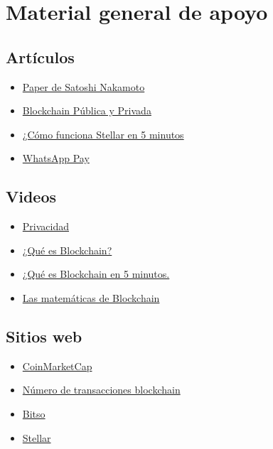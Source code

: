 \documentclass[a4paper,12pt]{/home/armando/Documentos/Cursos/LaTeX/Plantillas/lib/pub}
\begin{document}
\section{Material general de apoyo}
	\subsection{Artículos}
	\begin{itemize}
		\item \href{https://bitcoin.org/files/bitcoin-paper/bitcoin\_es\_latam.pdf}{Paper de Satoshi Nakamoto}
		\item \href{https://medium.com/@marvin.soto/blockchain-público-vs-blockchain-privado-cuál-es-la-diferencia-8115be4a593b}{Blockchain Pública y Privada}
		\item \href{https://medium.com/blockchain-academy-mexico/aprende-c%C3%B3mo-funciona-stellar-en-5-minutos-765d3e0b6027}{¿Cómo funciona Stellar en 5 minutos}
		\item \href{https://www.xataka.com/aplicaciones/whatsapp-pay-sistema-pagos-whatsapp-llegara-a-varios-paises-proximos-seis-meses?fbclid=IwAR03PMR7ZqF2t_TRfVwdp7VAG5fyt9-DbxErcku5fPAIZEmKdCcv7UDLFsQ}{WhatsApp Pay}
		
	\end{itemize}
	\subsection{Videos}
	\begin{itemize}
		\item \href{https://www.youtube.com/watch?v=RSj9QQMPMWg}{Privacidad}
		\item \href{https://www.youtube.com/watch?v=E2QT9RHmNsY}{¿Qué es Blockchain?}	
		\item \href{https://www.youtube.com/watch?v=Yn8WGaO\_\_ak\&list=PLgo3Qtdm2bOMKyzFGy-B3MiDAGPIeqbKP\&index=2}{¿Qué es Blockchain en 5 minutos.}
		\item \href{https://www.youtube.com/watch?v=b5dhq3dSG2k}{Las matemáticas de Blockchain}
	\end{itemize}
	\subsection{Sitios web}
	\begin{itemize}
		\item \href{https://coinmarketcap.com/}{CoinMarketCap}
		\item \href{https://www.blockchain.com/charts/n-transactions?timespan=all}{Número de transacciones blockchain}
		\item \href{https://bitso.com/}{Bitso}
		\item \href{https://www.stellar.org/}{Stellar}
	\end{itemize}
\end{document}
